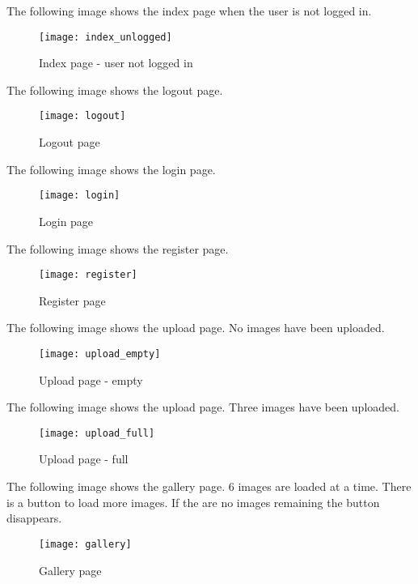 \documentclass[../documentation.tex]{subfiles}
\begin{document}
The following image shows the index page when the user is not logged in.

\begin{figure}[h]
    \centering
    \texttt{[image: index\_unlogged]}
    \caption{Index page - user not logged in}
\end{figure}

\pagebreak

The following image shows the logout page.

\begin{figure}[h]
    \centering
    \texttt{[image: logout]}
    \caption{Logout page}
\end{figure}

The following image shows the login page.

\begin{figure}[h]
    \centering
    \texttt{[image: login]}
    \caption{Login page}
\end{figure}

\pagebreak

The following image shows the register page.

\begin{figure}[h]
    \centering
    \texttt{[image: register]}
    \caption{Register page}
\end{figure}

The following image shows the upload page.
No images have been uploaded.

\begin{figure}[h]
    \centering
    \texttt{[image: upload\_empty]}
    \caption{Upload page - empty}
\end{figure}

\pagebreak

The following image shows the upload page.
Three images have been uploaded.

\begin{figure}[h]
    \centering
    \texttt{[image: upload\_full]}
    \caption{Upload page - full}
\end{figure}

The following image shows the gallery page.
6 images are loaded at a time. There is a button
to load more images. If the are no images remaining
the button disappears.

\begin{figure}[h]
    \centering
    \texttt{[image: gallery]}
    \caption{Gallery page}
\end{figure}
\end{document}
